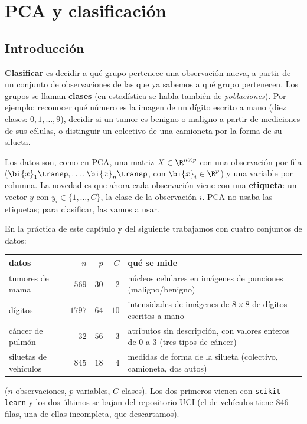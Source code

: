 \chapter{PCA y clasificación}\label{clas-cap}

\section{Introducción}\label{clas-sec:intro}

\textbf{Clasificar} es decidir a qué grupo pertenece una observación nueva, a
partir de un conjunto de observaciones de las que ya sabemos a qué grupo
pertenecen. Los grupos se llaman \textbf{clases} (en estadística se habla
también de \emph{poblaciones}). Por ejemplo: reconocer qué número es la imagen
de un dígito escrito a mano (diez clases: $0,1,\dots,9$), decidir si un tumor
es benigno o maligno a partir de mediciones de sus células, o distinguir un
colectivo de una camioneta por la forma de su silueta.

Los datos son, como en PCA, una matriz $X\in\R^{n\times p}$ con una
observación por fila ($\bi{x}_1\transp,\dots,\bi{x}_n\transp$, con $\bi{x}_i\in\R^p$) y una
variable por columna. La novedad es que ahora cada observación viene con una
\textbf{etiqueta}: un vector $y$ con $y_i\in\{1,\dots,C\}$, la clase de la
observación $i$. PCA no usaba las etiquetas; para clasificar, las vamos a usar.

En la práctica de este capítulo y del siguiente trabajamos con cuatro
conjuntos de datos:
\begin{center}
\small\renewcommand{\arraystretch}{1.15}
\begin{tabular}{lrrrp{6.2cm}}
datos & $n$ & $p$ & $C$ & qué se mide\\\hline
tumores de mama & $569$ & $30$ & $2$ & núcleos celulares en imágenes de punciones (maligno/benigno)\\
dígitos & $1797$ & $64$ & $10$ & intensidades de imágenes de $8\times8$ de dígitos escritos a mano\\
cáncer de pulmón & $32$ & $56$ & $3$ & atributos sin descripción, con valores enteros de $0$ a $3$ (tres tipos de cáncer)\\
siluetas de vehículos & $845$ & $18$ & $4$ & medidas de forma de la silueta (colectivo, camioneta, dos autos)
\end{tabular}
\end{center}
($n$ observaciones, $p$ variables, $C$ clases). Los dos primeros vienen con
\texttt{scikit-learn} y los dos últimos se bajan del repositorio UCI
\cite{UCI} (el de vehículos tiene $846$ filas, una de ellas incompleta, que
descartamos).

